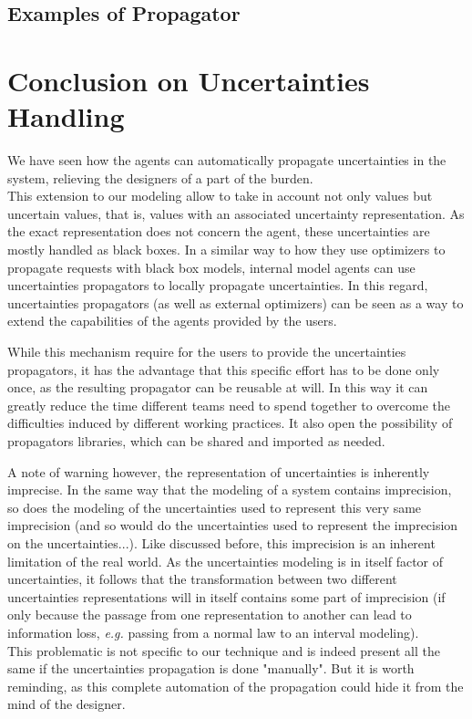 \subsection{Examples of Propagator}

\section{Conclusion on Uncertainties Handling}

We have seen how the agents can automatically propagate uncertainties in the system, relieving the designers of a part of the burden.\\
This extension to our modeling allow to take in account not only values but uncertain values, that is, values with an associated uncertainty representation. As the exact representation does not concern the agent, these uncertainties are mostly handled as black boxes. In a similar way to how they use optimizers to propagate requests with black box models, internal model agents can use uncertainties propagators to locally propagate uncertainties. In this regard, uncertainties propagators (as well as external optimizers) can be seen as a way to extend the capabilities of the agents provided by the users.

While this mechanism require for the users to provide the uncertainties propagators, it has the advantage that this specific effort has to be done only once, as the resulting propagator can be reusable at will. In this way it can greatly reduce the time different teams need to spend together to overcome the difficulties induced by different working practices. It also open the possibility of propagators libraries, which can be shared and imported as needed.

A note of warning however, the representation of uncertainties is inherently imprecise. In the same way that the modeling of a system contains imprecision, so does the modeling of the uncertainties used to represent this very same imprecision (and so would do the uncertainties used to represent the imprecision on the uncertainties...). Like discussed before, this imprecision is an inherent limitation of the real world. As the uncertainties modeling is in itself factor of uncertainties, it follows that the transformation between two different uncertainties representations will in itself contains some part of imprecision (if only because the passage from one representation to another can lead to information loss, \emph{e.g.} passing from a normal law to an interval modeling).\\
This problematic is not specific to our technique and is indeed  present all the same if the uncertainties propagation is done "manually". But it is worth reminding, as this complete automation of the propagation could hide it from the mind of the designer.

